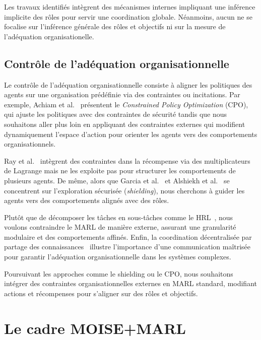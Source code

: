 \documentclass[final]{jfsma}
\begin{document}
Les travaux identifiés intègrent des mécanismes internes impliquant une inférence  implicite des rôles pour servir une coordination globale. Néanmoins, aucun ne se focalise sur l'inférence générale des rôles et objectifs ni sur la mesure de l'adéquation organisationelle.

\subsection{Contrôle de l'adéquation organisationnelle}

Le contrôle de l'adéquation organisationnelle consiste à aligner les politiques des agents sur une organisation prédéfinie via des contraintes ou incitations. Par exemple, Achiam et al.~\cite{achiam2017cpo} présentent le \textit{Constrained Policy Optimization} (CPO), qui ajuste les politiques avec des contraintes de sécurité tandis que nous souhaitons aller plus loin en appliquant des contraintes externes qui modifient dynamiquement l'espace d'action pour orienter les agents vers des comportements organisationnels.

Ray et al.~\cite{ray2019benchmarking} intègrent des contraintes dans la récompense via des multiplicateurs de Lagrange mais ne les exploite pas pour structurer les comportements de plusieurs agents. De même, alors que Garcia et al.~\cite{garcia2015comprehensive} et Alshiekh et al.~\cite{alshiekh2018safe} se concentrent sur l'exploration sécurisée (\textit{shielding}), nous cherchons à guider les agents vers des comportements alignés avec des rôles.

Plutôt que de décomposer les tâches en sous-tâches comme le HRL~\cite{ghavamzadeh2006hrl}, nous voulons contraindre le MARL de manière externe, assurant une granularité modulaire et des comportements affinés. Enfin, la coordination décentralisée par partage des connaissances~\cite{foerster2018communication} illustre l'importance d'une communication maîtrisée pour garantir l'adéquation organisationnelle dans les systèmes complexes.

Poursuivant les approches comme le shielding ou le CPO, nous souhaitons intégrer des contraintes organisationnelles externes en MARL standard, modifiant actions et récompenses pour s'aligner sur des rôles et objectifs.


\section{Le cadre MOISE+MARL}
\label{sec:moise_marl_framework}
\end{document}
